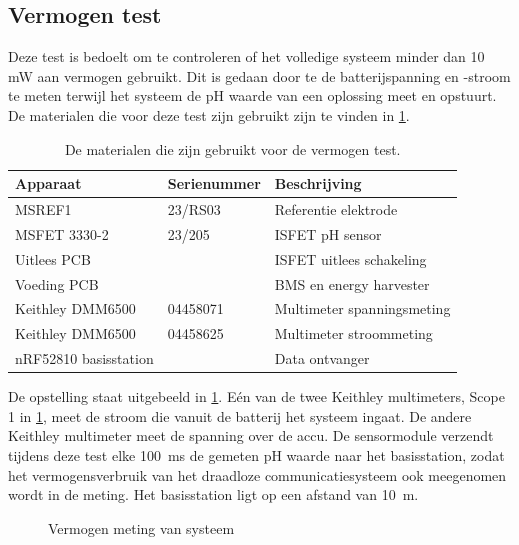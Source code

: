 \subsection{Vermogen test} \label{sec:vermogenTest}
Deze test is bedoelt om te controleren of het volledige systeem minder dan 10 mW aan vermogen gebruikt. Dit is gedaan door te de batterijspanning en -stroom te meten terwijl het systeem de pH waarde van een oplossing meet en opstuurt. De materialen die voor deze test zijn gebruikt zijn te vinden in \cref{tab:testMaterialen3}.
\begin{table}[!htbp]
    \centering
    \begin{tabular}{l|l|l}
        Apparaat         & Serienummer & Beschrijving \\
        \hline
        MSREF1           & 23/RS03     & Referentie elektrode       \\
        MSFET 3330-2     & 23/205      & ISFET pH sensor            \\
        Uitlees PCB      &             & ISFET uitlees schakeling   \\
        Voeding PCB      &             & BMS en energy harvester    \\
        Keithley DMM6500 & 04458071    & Multimeter spanningsmeting \\
        Keithley DMM6500 & 04458625    & Multimeter stroommeting    \\
        nRF52810 basisstation &        & Data ontvanger \\
        \hline
    \end{tabular}
    \caption{De materialen die zijn gebruikt voor de vermogen test.}
    \label{tab:testMaterialen3}
\end{table}
De opstelling staat uitgebeeld in \cref{fig:vermogenMetingOpstelling}. Eén van de twee Keithley multimeters, Scope 1 in \cref{fig:vermogenMetingOpstelling}, meet de stroom die vanuit de batterij het systeem ingaat. De andere Keithley multimeter meet de spanning over de accu. De sensormodule verzendt tijdens deze test elke \qty{100}{\milli\second} de gemeten pH waarde naar het basisstation, zodat het vermogensverbruik van het draadloze communicatiesysteem ook meegenomen wordt in de meting. Het basisstation ligt op een afstand van \qty{10}{\meter}.


\begin{figure}[!htbp]
    \centering
    \def\svgwidth{0.6\textwidth}
    
    \caption{Vermogen meting van systeem}
    \label{fig:vermogenMetingOpstelling}
\end{figure}

